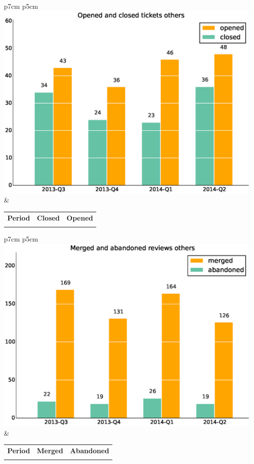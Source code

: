 \documentclass[a4wide,11pt]{report}
\begin{document}
\begin{tabular}{p{7cm} p{5cm}}
    \vspace{0pt} 
    \includegraphics[scale=.35]{figs/closedothers.eps}
    & 
    \vspace{0pt}
    \begin{tabular}{l|r|r|}%
\bfseries Period & \bfseries Closed & \bfseries Opened
    \csvreader[head to column names]{data/closedothers.csv}{}%
    {\\ & \closed & \opened}
    \end{tabular}
\end{tabular}

\begin{tabular}{p{7cm} p{5cm}}
    \vspace{0pt} 
    \includegraphics[scale=.35]{figs/submitted_reviewsothers.eps}
    & 
    \vspace{0pt}
    \begin{tabular}{l|r|r|}%
    \bfseries Period & \bfseries Merged & \bfseries Abandoned %
    \csvreader[head to column names]{data/submitted_reviewsothers.csv}{}%
    {\\ & \merged & \abandoned}
    \end{tabular}
\end{tabular}
\end{document}

